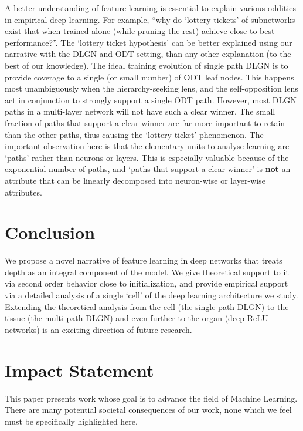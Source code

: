 \documentclass{article}
\theoremstyle{plain}
\theoremstyle{definition}
\theoremstyle{remark}
\newcommand{\1}{{\mathbf 1}}
\newcommand{\0}{{\mathbf 0}}
\renewcommand{\>}{{\rightarrow}}
\begin{document}
A better understanding of feature learning is essential to explain various oddities in empirical deep learning. For example, ``why do `lottery tickets' of subnetworks exist that when trained alone (while pruning the rest) achieve close to best performance?''. The `lottery ticket hypothesis' \cite{FrankleCarbin19} can be better explained using our narrative with the DLGN and ODT setting, than any other explanation (to the best of our knowledge). The ideal training evolution of single path DLGN is to provide coverage to a single (or small number) of ODT leaf nodes. This happens most unambiguously when the hierarchy-seeking lens, and the self-opposition lens act in conjunction to strongly support a single ODT path. However, most DLGN paths in a multi-layer network will not have such a clear winner. The small fraction of paths that support a clear winner are far more important to retain than the other paths, thus causing the `lottery ticket' phenomenon. The important observation here is that the elementary units to analyse learning are `paths' rather than neurons or layers. This is especially valuable because of the exponential number of paths, and `paths that support a clear winner' is \textbf{not} an attribute that can be linearly decomposed into neuron-wise or layer-wise attributes.



\section{Conclusion}
We propose a novel narrative of feature learning in deep networks that treats depth as an integral component of the model. We give theoretical support to it via second order behavior close to initialization, and provide empirical support via a detailed analysis of a single `cell' of the deep learning architecture we study. Extending the theoretical analysis from the cell (the single path DLGN) to the tissue (the multi-path DLGN) and even further to the organ (deep ReLU networks) is an exciting direction of future research.

\section{Impact Statement}

This paper presents work whose goal is to advance the field of Machine Learning. There are many potential societal consequences of our work, none which we feel must be specifically highlighted here.


\appendix
\onecolumn
\end{document}
